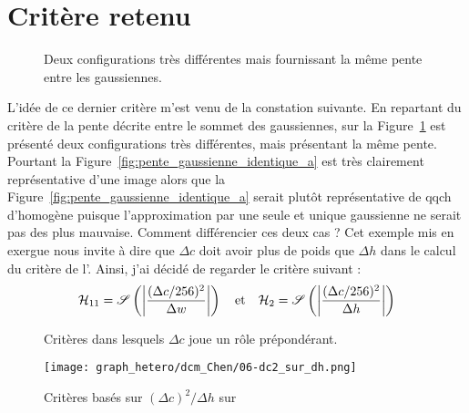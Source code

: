\documentclass[main.tex]{subfiles}
\begin{document}
\section{Critère retenu}
\begin{figure}
\centering
{}
\caption{\label{fig:pente_gaussienne_identique}Deux configurations très différentes mais fournissant la même pente entre les gaussiennes.}
\end{figure}
L'idée de ce dernier critère m'est venu de la constation suivante.
En repartant du critère de la pente décrite entre le sommet des gaussiennes, sur la Figure~\ref{fig:pente_gaussienne_identique} est présenté deux configurations très différentes, mais présentant la même pente. Pourtant la Figure~\ref{fig:pente_gaussienne_identique_a} est très clairement représentative d'une image \heterogene alors que la Figure~\ref{fig:pente_gaussienne_identique_a} serait plutôt représentative de qqch d'homogène puisque l'approximation par une seule et unique gaussienne ne serait pas des plus mauvaise. 
Comment différencier ces deux cas ? Cet exemple mis en exergue nous invite à dire que $\Delta c$ doit avoir plus de poids que $\Delta h$ dans le calcul du critère de l'\hetero. Ainsi, j'ai décidé de regarder le critère suivant :
\begin{equation}
\label{eq:criteres_finaux}
\mathcal{H}_{11} = \mathscr{S}\left( \left| \dfrac{(\Delta c /256)^2}{\Delta w} \right| \right)
\quad {\rm et } \quad
\mathcal{H}_{2} = \mathscr{S} \left( \left| \dfrac{(\Delta c /256)^2}{\Delta h} \right| \right)
\end{equation}
\begin{figure}
\centering
{}
\caption{\label{fig:critere_avec_dc2}Critères dans lesquels $\Delta c$ joue un rôle prépondérant.}
\end{figure}


\begin{figure}
\centering
\texttt{[image: graph\_hetero/dcm\_Chen/06-dc2\_sur\_dh.png]}
\caption{\label{fig:critere_dc2_sur_dh_Chen} Critères basés sur $(\Delta c)^2 / \Delta h$ sur \Chen }
\end{figure}
\end{document}
